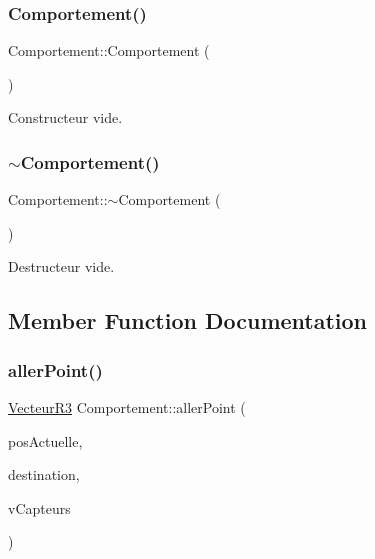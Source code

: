\subsubsection{\texorpdfstring{Comportement()}{Comportement()}}
{\footnotesize\ttfamily Comportement\+::\+Comportement (\begin{DoxyParamCaption}{ }\end{DoxyParamCaption})}

Constructeur vide. \mbox{\label{class_comportement_acbe985635ed33cf141f380720c2e3f77}} 
\subsubsection{\texorpdfstring{$\sim$\+Comportement()}{~Comportement()}}
{\footnotesize\ttfamily Comportement\+::$\sim$\+Comportement (\begin{DoxyParamCaption}{ }\end{DoxyParamCaption})\hspace{0.3cm}{\ttfamily [virtual]}}

Destructeur vide. 

\subsection{Member Function Documentation}
\mbox{\label{class_comportement_a4404a711b71657ca68c0b199ecf023b8}} 
\subsubsection{\texorpdfstring{aller\+Point()}{allerPoint()}}
{\footnotesize\ttfamily \mbox{\hyperlink{class_vecteur_r3}{Vecteur\+R3}} Comportement\+::aller\+Point (\begin{DoxyParamCaption}\item[{\mbox{\hyperlink{class_vecteur_r3}{Vecteur\+R3}}}]{pos\+Actuelle,  }\item[{\mbox{\hyperlink{class_vecteur_r3}{Vecteur\+R3}}}]{destination,  }\item[{std\+::vector$<$ \mbox{\hyperlink{class_capteur}{Capteur}} $>$}]{v\+Capteurs }\end{DoxyParamCaption})}

